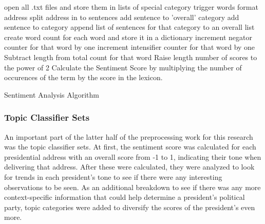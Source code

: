\begin{singlespace}
\begin{algorithm}[H]
\DontPrintSemicolon
{}
\BlankLine
open all .txt files and store them in lists of special category trigger words\;
	{format address\;
	split address in to sentences\;
		{add sentence to 'overall' category\;
		{add sentence to category}
		{append list of sentences for that category to an overall list}
		{
			{create word count for each word and store it in a dictionary\;
				{increment negator counter for that word by one}
				{increment intensifier counter for that word by one}
			}
		{
		{
		{Subtract length from total count for that word}
		}
		{Raise length number of scores to the power of 2}
		Calculate the Sentiment Score by multiplying the number of occurences of the term by the score in the lexicon.
		}
		}
	}
	}
	
\caption{Sentiment Analysis Algorithm}
\label{alg:one}
\end{algorithm}
\end{singlespace}

\subsubsection{Topic Classifier Sets}
An important part of the latter half of the preprocessing work for this research was the topic classifier sets.
At first, the sentiment score was calculated for each presidential address with an overall score from -1 to 1, indicating their tone when delivering that address.
After these were calculated, they were analyzed to look for trends in each president's tone to see if there were any interesting observations to be seen.
As an additional breakdown to see if there was any more context-specific information that could help determine a president's political party, topic categories were added to diversify the scores of the president's even more.

